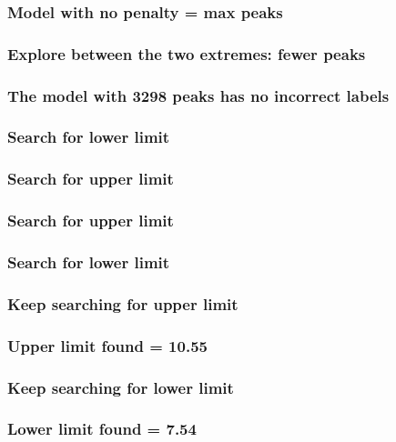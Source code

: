 \documentclass{beamer}
\begin{document}
\begin{frame}
  \frametitle{Model with no penalty = max peaks}
\end{frame}

\begin{frame}
  \frametitle{Explore between the two extremes: fewer peaks}
\end{frame}

\begin{frame}
  \frametitle{The model with 3298 peaks has no incorrect labels }
\end{frame}

\begin{frame}
  \frametitle{Search for lower limit}
\end{frame}

\begin{frame}
  \frametitle{Search for upper limit}
\end{frame}

\begin{frame}
  \frametitle{Search for upper limit}
\end{frame}

\begin{frame}
  \frametitle{Search for lower limit}
\end{frame}


\begin{frame}
  \frametitle{Keep searching for upper limit}
\end{frame}

\begin{frame}
  \frametitle{Upper limit found = 10.55}
\end{frame}
 
\begin{frame}
  \frametitle{Keep searching for lower limit}
\end{frame}

\begin{frame}
  \frametitle{Lower limit found = 7.54}
\end{frame}
\end{document}
